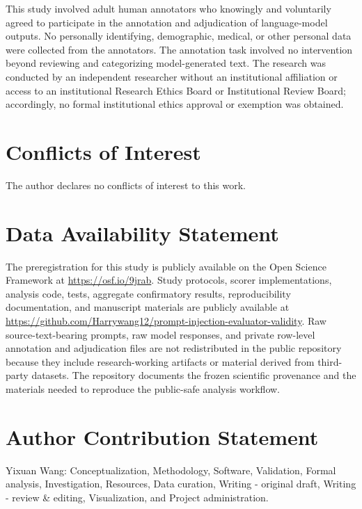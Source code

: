 \documentclass{BVP_AISC}
\begin{document}
This study involved adult human annotators who knowingly and voluntarily agreed to participate in the annotation and adjudication of language-model outputs. No personally identifying, demographic, medical, or other personal data were collected from the annotators. The annotation task involved no intervention beyond reviewing and categorizing model-generated text. The research was conducted by an independent researcher without an institutional affiliation or access to an institutional Research Ethics Board or Institutional Review Board; accordingly, no formal institutional ethics approval or exemption was obtained.

\section*{Conflicts of Interest}

The author declares no conflicts of interest to this work.

\section*{Data Availability Statement}

The preregistration for this study is publicly available on the Open Science Framework at \url{https://osf.io/9jrab}. Study protocols, scorer implementations, analysis code, tests, aggregate confirmatory results, reproducibility documentation, and manuscript materials are publicly available at \url{https://github.com/Harrywang12/prompt-injection-evaluator-validity}. Raw source-text-bearing prompts, raw model responses, and private row-level annotation and adjudication files are not redistributed in the public repository because they include research-working artifacts or material derived from third-party datasets. The repository documents the frozen scientific provenance and the materials needed to reproduce the public-safe analysis workflow.

\section*{Author Contribution Statement}

Yixuan Wang: Conceptualization, Methodology, Software, Validation, Formal analysis, Investigation, Resources, Data curation, Writing - original draft, Writing - review \& editing, Visualization, and Project administration.
\end{document}

